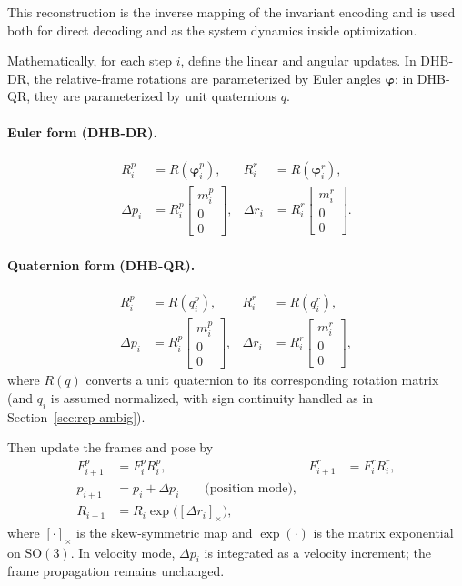 \documentclass[11pt]{article}
\begin{document}
This reconstruction is the inverse mapping of the invariant encoding and is used both for direct decoding and as the system dynamics inside optimization.

Mathematically, for each step $i$, define the linear and angular updates. In DHB-DR, the relative-frame rotations are parameterized by Euler angles $\bm{\varphi}$; in DHB-QR, they are parameterized by unit quaternions $q$.

\paragraph{Euler form (DHB-DR).}
\begin{align}
  R_i^p &= R(\bm{\varphi}_i^p), & R_i^r &= R(\bm{\varphi}_i^r), \\
  \Delta p_i &= R_i^p
  \begin{bmatrix} m_i^p \\ 0 \\ 0
  \end{bmatrix},
  & \Delta r_i &= R_i^r
  \begin{bmatrix} m_i^r \\ 0 \\ 0
  \end{bmatrix}.
\end{align}

\paragraph{Quaternion form (DHB-QR).}
\begin{align}
  R_i^p &= R(q_i^p), & R_i^r &= R(q_i^r), \\
  \Delta p_i &= R_i^p
  \begin{bmatrix} m_i^p \\ 0 \\ 0
  \end{bmatrix},
  & \Delta r_i &= R_i^r
  \begin{bmatrix} m_i^r \\ 0 \\ 0
  \end{bmatrix},
\end{align}
where $R(q)$ converts a unit quaternion to its corresponding rotation matrix (and $q_i$ is assumed normalized, with sign continuity handled as in Section~\ref{sec:rep-ambig}).

Then update the frames and pose by
\begin{align}
  F_{i+1}^p &= F_i^p R_i^p, & F_{i+1}^r &= F_i^r R_i^r, \\
  p_{i+1} &= p_i + \Delta p_i \qquad \text{(position mode)}, \\
  R_{i+1} &= R_i \exp\bigl([\Delta r_i]_\times\bigr),
\end{align}
where $[\cdot]_\times$ is the skew-symmetric map and $\exp(\cdot)$ is the matrix exponential on $\mathrm{SO}(3)$. In velocity mode, $\Delta p_i$ is integrated as a velocity increment; the frame propagation remains unchanged.
\end{document}
